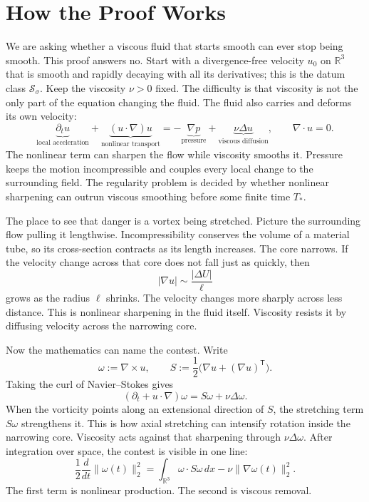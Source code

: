 \begingroup
\setlength{\parindent}{0pt}
\setlength{\parskip}{0.58\baselineskip}
\setlength{\abovedisplayskip}{9pt plus 2pt minus 2pt}
\setlength{\belowdisplayskip}{9pt plus 2pt minus 2pt}
\setlength{\jot}{7pt}

\section*{How the Proof Works}

We are asking whether a viscous fluid that starts smooth can ever stop being
smooth.  This proof answers no.  Start with a divergence-free velocity \(u_0\)
on \(\mathbb R^3\) that is smooth and rapidly decaying with all its derivatives;
this is the datum class \(\mathcal S_\sigma\).  Keep the viscosity \(\nu>0\)
fixed.  The difficulty is that viscosity is not the
only part of the equation changing the fluid.  The fluid also carries and
deforms its own velocity:
\[
\underbrace{\partial_tu}_{\text{local acceleration}}
+\underbrace{(u\!\cdot\nabla)u}_{\text{nonlinear transport}}
=-\underbrace{\nabla p}_{\text{pressure}}
+\underbrace{\nu\Delta u}_{\text{viscous diffusion}},
\qquad \nabla\!\cdot u=0.
\]
The nonlinear term can sharpen the flow while viscosity smooths it.  Pressure
keeps the motion incompressible and couples every local change to the
surrounding field.  The regularity problem is decided by whether nonlinear
sharpening can outrun viscous smoothing before some finite time \(T_*\).

The place to see that danger is a vortex being stretched.  Picture the
surrounding flow pulling it lengthwise.  Incompressibility conserves the volume
of a material tube, so its cross-section contracts as its length increases.
The core narrows.  If the velocity change across that core does not fall just
as quickly, then
\[
|\nabla u|\sim\frac{|\Delta U|}{\ell}
\]
grows as the radius \(\ell\) shrinks.  The velocity changes more sharply across
less distance.  This is nonlinear sharpening in the fluid itself.  Viscosity
resists it by diffusing velocity
across the narrowing core.

Now the mathematics can name the contest.  Write
\[
\omega:=\nabla\times u,
\qquad
S:=\frac12\bigl(\nabla u+(\nabla u)^{\mathsf T}\bigr).
\]
Taking the curl of Navier--Stokes gives
\[
(\partial_t+u\!\cdot\nabla)\omega
=S\omega+\nu\Delta\omega.
\]
When the vorticity points along an extensional direction of \(S\), the
stretching term \(S\omega\) strengthens it.  This is how axial stretching can
intensify rotation inside the narrowing core.  Viscosity acts against that
sharpening through \(\nu\Delta\omega\).  After integration over space, the
contest is visible in one line:
\[
\frac12\frac{d}{dt}\|\omega(t)\|_2^2
=\int_{\mathbb R^3}\omega\!\cdot S\omega\,dx
-\nu\|\nabla\omega(t)\|_2^2.
\]
The first term is nonlinear production.  The second is viscous removal.

